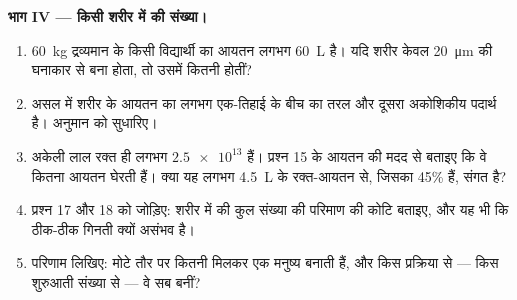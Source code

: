 \begin{problem}
\medskip
\noindent\textbf{भाग IV --- किसी शरीर में  की संख्या।}
\begin{enumerate}[resume]
  \item \qty{60}{kg} द्रव्यमान के किसी विद्यार्थी का आयतन लगभग
        \qty{60}{L} है। यदि शरीर केवल \qty{20}{\micro m} की घनाकार
         से बना होता, तो उसमें कितनी  होतीं?
  \item असल में शरीर के आयतन का लगभग एक-तिहाई  के बीच का तरल और
        दूसरा अकोशिकीय पदार्थ है। अनुमान को सुधारिए।
  \item अकेली लाल रक्त  ही लगभग $\num{2.5e13}$ हैं। प्रश्न 15 के
        आयतन की मदद से बताइए कि वे कितना आयतन घेरती हैं। क्या यह लगभग
        \qty{4.5}{L} के रक्त-आयतन से, जिसका 45\%  हैं, संगत है?
  \item प्रश्न 17 और 18 को जोड़िए: शरीर में  की कुल संख्या की
        परिमाण की कोटि बताइए, और यह भी कि ठीक-ठीक गिनती क्यों असंभव है।
  \item परिणाम लिखिए: मोटे तौर पर कितनी  मिलकर एक मनुष्य बनाती
        हैं, और किस प्रक्रिया से --- किस शुरुआती संख्या से --- वे सब
        बनीं?
\end{enumerate}
\end{problem}
